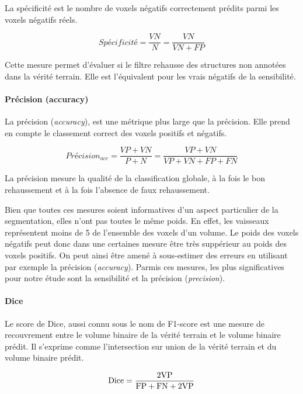 La spécificité est le nombre de voxels négatifs correctement prédits parmi les voxels négatifs réels.

\begin{equation}
  Spécificité = \frac{VN}{N} = \frac{VN}{VN+FP}
\end{equation}

Cette mesure permet d'évaluer si le filtre rehausse des structures non annotées dans la vérité terrain. Elle est l'équivalent pour les vrais négatifs de la sensibilité.

\paragraph{Précision (accuracy)}

La précision (\textit{accuracy}), est une métrique plus large que la précision. Elle prend en compte le classement correct des voxels positifs et négatifs. 

\begin{equation}
  Précision_{acc} = \frac{VP+VN}{P+N} = \frac{VP+VN}{VP+VN+FP+FN}
\end{equation}

La précision mesure la qualité de la classification globale, à la fois le bon rehaussement et à la fois l'absence de faux rehaussement.

Bien que toutes ces mesures soient informatives d'un aspect particulier de la segmentation, elles n'ont pas toutes le même poids. En effet, les vaisseaux représentent moins de 5 \percent de l'ensemble des voxels d'un volume. Le poids des voxels négatifs peut donc dans une certaines mesure être très suppérieur au poids des voxels positifs. On peut ainsi être amené à sous-estimer des erreurs en utilisant par exemple la précision (\textit{accuracy}). Parmis ces mesures, les plus significatives pour notre étude sont la sensibilité et la précision (\textit{precision}).


\paragraph{Dice}

Le score de Dice, aussi connu sous le nom de F1-score est une mesure de recouvrement entre le volume binaire de la vérité terrain et le volume binaire prédit. Il s'exprime comme l'intersection sur union de la vérité terrain et du volume binaire prédit.

\begin{equation}
  \textrm{Dice} = \frac{2 \textrm{VP}}{\textrm{FP} + \textrm{FN} + 2 \textrm{VP}} \\ 
\end{equation}

